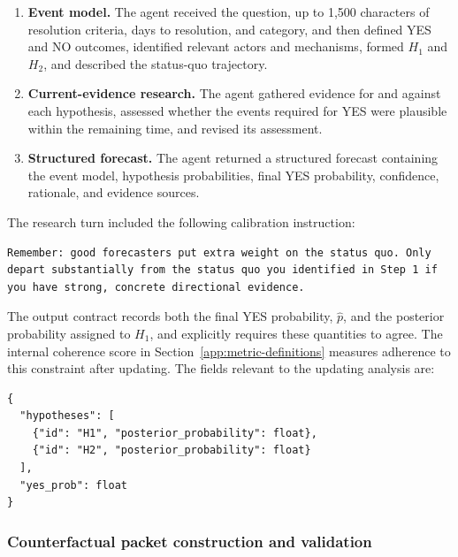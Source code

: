 \begin{enumerate}
\item \textbf{Event model.} The agent received the question, up to 1,500 characters of resolution criteria, days to resolution, and category, and then defined YES and NO outcomes, identified relevant actors and mechanisms, formed $H_1$ and $H_2$, and described the status-quo trajectory.
\item \textbf{Current-evidence research.} The agent gathered evidence for and against each hypothesis, assessed whether the events required for YES were plausible within the remaining time, and revised its assessment.
\item \textbf{Structured forecast.} The agent returned a structured forecast containing the event model, hypothesis probabilities, final YES probability, confidence, rationale, and evidence sources.
\end{enumerate}

The research turn included the following calibration instruction:

\begin{small}
\begin{verbatim}
Remember: good forecasters put extra weight on the status quo. Only
depart substantially from the status quo you identified in Step 1 if
you have strong, concrete directional evidence.
\end{verbatim}
\end{small}

The output contract records both the final YES probability, $\hat p$, and the posterior probability assigned to $H_1$, and explicitly requires these quantities to agree.
The internal coherence score in Section~\ref{app:metric-definitions} measures adherence to this constraint after updating.
The fields relevant to the updating analysis are:

\begin{small}
\begin{verbatim}
{
  "hypotheses": [
    {"id": "H1", "posterior_probability": float},
    {"id": "H2", "posterior_probability": float}
  ],
  "yes_prob": float
}
\end{verbatim}
\end{small}

\subsubsection{Counterfactual packet construction and validation}
\label{app:cf-taxonomy}

